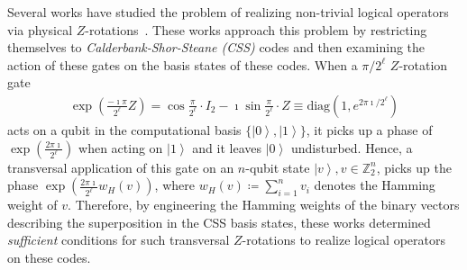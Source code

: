\documentclass[twoside,romanappendices]{IEEEtran}
\newcommand{\ket}[1]{\left\lvert #1 \right\rangle}
\begin{document}
Several works have studied the problem of realizing non-trivial logical operators via physical $Z$-rotations~\cite{Bravyi-pra12,Haah-quantum17b,Campbell-pra17,Campbell-prl17,Vuillot-arxiv19}.
These works approach this problem by restricting themselves to \emph{Calderbank-Shor-Steane (CSS)} codes and then examining the action of these gates on the basis states of these codes.
When a $\pi/2^{\ell}$ $Z$-rotation gate 
\begin{align}
\label{eq:Zrotations}
\exp\left( \frac{-\imath\pi}{2^{\ell}} Z \right) = \cos\frac{\pi}{2^{\ell}} \cdot I_2 - \imath \sin\frac{\pi}{2^{\ell}} \cdot Z \equiv \text{diag}\left( 1, e^{2\pi\imath/2^{\ell}} \right)
\end{align}
acts on a qubit in the computational basis $\{ \ket{0}, \ket{1} \}$, it picks up a phase of $\exp\left( \frac{2\pi\imath}{2^{\ell}} \right)$ when acting on $\ket{1}$ and it leaves $\ket{0}$ undisturbed.
Hence, a transversal application of this gate on an $n$-qubit state $\ket{v}, v \in \mathbb{Z}_2^n$, picks up the phase $\exp\left( \frac{2\pi\imath}{2^{\ell}} w_H(v) \right)$, where $w_H(v) \coloneqq \sum_{i=1}^{n} v_i$ denotes the Hamming weight of $v$.
Therefore, by engineering the Hamming weights of the binary vectors describing the superposition in the CSS basis states, these works determined \emph{sufficient} conditions for such transversal $Z$-rotations to realize logical operators on these codes.
\end{document}
